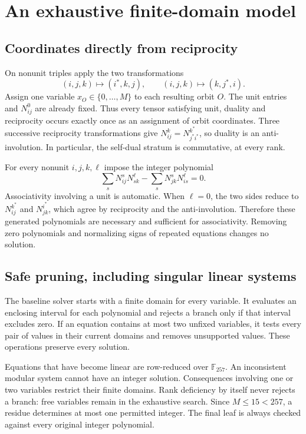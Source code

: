 \documentclass[11pt,a4paper]{article}
\theoremstyle{definition}\newtheorem{definition}[theorem]{Definition}\newtheorem{remark}[theorem]{Remark}
\begin{document}
\section{An exhaustive finite-domain model}
\subsection{Coordinates directly from reciprocity}
On nonunit triples apply the two transformations
\[
(i,j,k)\longmapsto(i^*,k,j),\qquad
(i,j,k)\longmapsto(k,j^*,i).
\]
Assign one variable $x_O\in\{0,\ldots,M\}$ to each resulting orbit $O$.
The unit entries and $N_{ij}^0$ are already fixed. Thus every tensor satisfying
unit, duality and reciprocity occurs exactly once as an assignment of orbit
coordinates. Three successive reciprocity transformations give
$N_{ij}^{k}=N_{j^*i^*}^{k^*}$, so duality is an anti-involution. In particular,
the self-dual stratum is commutative, at every rank.

For every nonunit $i,j,k,\ell$ impose the integer polynomial
\begin{equation}
 \sum_s N_{ij}^{s}N_{sk}^{\ell}-\sum_s N_{jk}^{s}N_{is}^{\ell}=0.
 \label{eq:associativity}
\end{equation}
Associativity involving a unit is automatic. When $\ell=0$, the two sides
reduce to $N_{ij}^{k^*}$ and $N_{jk}^{i^*}$, which agree by reciprocity and the
anti-involution. Therefore these generated polynomials are necessary and
sufficient for associativity. Removing zero polynomials and normalizing signs
of repeated equations changes no solution.

\subsection{Safe pruning, including singular linear systems}
The baseline solver starts with a finite domain for every variable. It evaluates
an enclosing interval for each polynomial and rejects a branch only if that
interval excludes zero. If an equation contains at most two unfixed variables,
it tests every pair of values in their current domains and removes unsupported
values. These operations preserve every solution.

Equations that have become linear are row-reduced over $\mathbb F_{257}$.
An inconsistent modular system cannot have an integer solution. Consequences
involving one or two variables restrict their finite domains. Rank deficiency
by itself never rejects a branch: free variables remain in the exhaustive
search. Since $M\leq15<257$, a residue determines at most one permitted integer.
The final leaf is always checked against every original integer polynomial.
\end{document}
